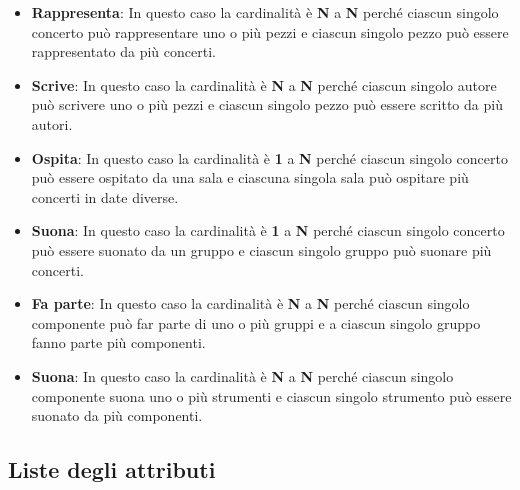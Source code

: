 \documentclass[12pt]{article}
\begin{document}
\begin{itemize}
    \item \textbf{Rappresenta}: In questo caso la cardinalità è \textbf{N} a \textbf{N} perché ciascun singolo concerto può rappresentare uno o più pezzi e ciascun singolo pezzo può essere rappresentato da più concerti.
    
    \item \textbf{Scrive}: In questo caso la cardinalità è \textbf{N} a \textbf{N} perché ciascun singolo autore può scrivere uno o più pezzi e ciascun singolo pezzo può essere scritto da più autori.
    
    \item \textbf{Ospita}: In questo caso la cardinalità è \textbf{1} a \textbf{N} perché ciascun singolo concerto può essere ospitato da una sala e ciascuna singola sala può ospitare più concerti in date diverse.
    
    \item \textbf{Suona}: In questo caso la cardinalità è \textbf{1} a \textbf{N} perché ciascun singolo concerto può essere suonato da un gruppo e ciascun singolo gruppo può suonare più concerti.
    
    \item \textbf{Fa parte}: In questo caso la cardinalità è \textbf{N} a \textbf{N} perché ciascun singolo componente può far parte di uno o più gruppi e a ciascun singolo gruppo fanno parte più componenti.
    
    \item \textbf{Suona}: In questo caso la cardinalità è \textbf{N} a \textbf{N} perché ciascun singolo componente suona uno o più strumenti e ciascun singolo strumento può essere suonato da più componenti.
\end{itemize} 

\clearpage


\begin{center}
    \section{Liste degli attributi}
\end{center}

\end{document}
